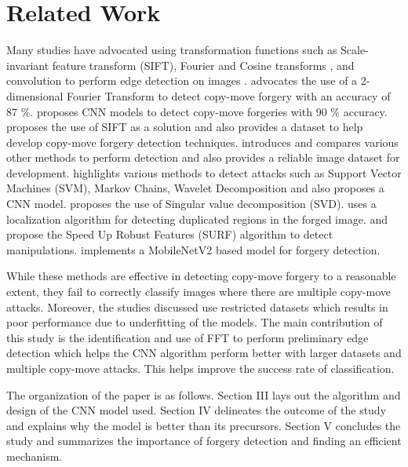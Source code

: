 \documentclass[conference]{IEEEtran}
\begin{document}
\section{Related Work}
Many studies have advocated using transformation functions such as Scale-invariant feature transform (SIFT), Fourier and Cosine transforms \cite{b19}, and convolution to perform edge detection on images \cite{b1}. \cite{b2} advocates the use of a 2-dimensional Fourier Transform to detect copy-move forgery with an accuracy of 87 \%. \cite{b3} proposes CNN models to detect copy-move forgeries with 90 \% accuracy. \cite{b4} proposes the use of SIFT as a solution and also provides a dataset to help develop copy-move forgery detection techniques. \cite{b5} introduces and compares various other methods to perform detection and also provides a reliable image dataset for development. \cite{b6} highlights various methods to detect attacks such as Support Vector Machines (SVM), Markov Chains, Wavelet Decomposition and also proposes a CNN model. \cite{b8} proposes the use of Singular value decomposition (SVD). \cite{b20} uses a localization algorithm for detecting duplicated regions in the forged image. \cite{b18} and \cite{bnew1} propose the Speed Up Robust Features (SURF) algorithm to detect manipulations. \cite{bnew2} implements a MobileNetV2 based model for forgery detection.

While these methods are effective in detecting copy-move forgery to a reasonable extent, they fail to correctly classify images where there are multiple copy-move attacks. Moreover, the studies discussed use restricted datasets which results in poor performance due to underfitting of the models. The main contribution of this study is the identification and use of FFT to perform preliminary edge detection which helps the CNN algorithm perform better with larger datasets and multiple copy-move attacks. This helps improve the success rate of classification.

The organization of the paper is as follows. Section III lays out the algorithm and design of the CNN model used. Section IV delineates the outcome of the study and explains why the model is better than its precursors. Section V concludes the study and summarizes the importance of forgery detection and finding an efficient mechanism.
\end{document}
